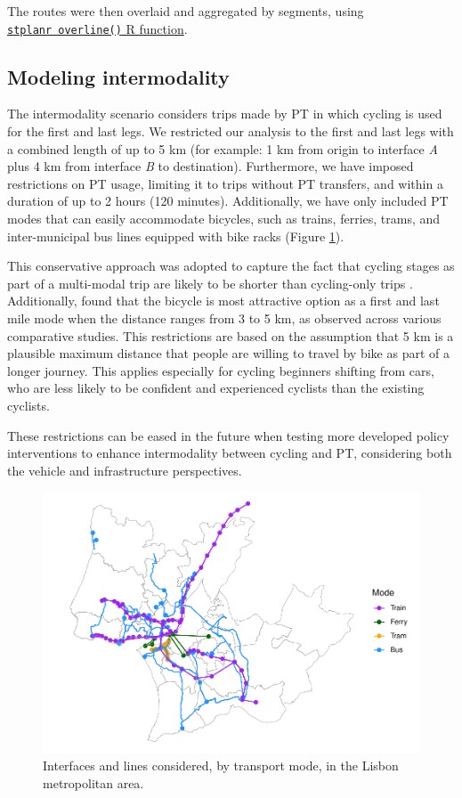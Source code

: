 \documentclass[review, doubleblind, 3p,
authoryear]{elsarticle} %
\begin{document}
The routes were then overlaid and aggregated by segments, using
\href{https://docs.ropensci.org/stplanr/reference/overline.html}{\texttt{stplanr\ overline()}
R function}.

\subsection{Modeling intermodality}\label{modeling-intermodality}

The intermodality scenario considers trips made by PT in which cycling
is used for the first and last legs. We restricted our analysis to the
first and last legs with a combined length of up to 5 km (for example: 1
km from origin to interface \emph{A} plus 4 km from interface \emph{B}
to destination). Furthermore, we have imposed restrictions on PT usage,
limiting it to trips without PT transfers, and within a duration of up
to 2 hours (120 minutes). Additionally, we have only included PT modes
that can easily accommodate bicycles, such as trains, ferries, trams,
and inter-municipal bus lines equipped with bike racks (Figure
\ref{fig:map1}).

This conservative approach was adopted to capture the fact that cycling
stages as part of a multi-modal trip are likely to be shorter than
cycling-only trips \citep{vanmil_insights_2021}. Additionally,
\citet{Leferink2017} found that the bicycle is most attractive option as
a first and last mile mode when the distance ranges from 3 to 5 km, as
observed across various comparative studies. This restrictions are based
on the assumption that 5 km is a plausible maximum distance that people
are willing to travel by bike as part of a longer journey. This applies
especially for cycling beginners shifting from cars, who are less likely
to be confident and experienced cyclists than the existing cyclists.

These restrictions can be eased in the future when testing more
developed policy interventions to enhance intermodality between cycling
and PT, considering both the vehicle and infrastructure perspectives.

\begin{figure}

{\centering \includegraphics[width=0.6\linewidth,]{PaperCEUS_rev1_files/figure-latex/map1-1} 

}

\caption{Interfaces and lines considered, by transport mode, in the Lisbon metropolitan area.}\label{fig:map1}
\end{figure}
\end{document}
